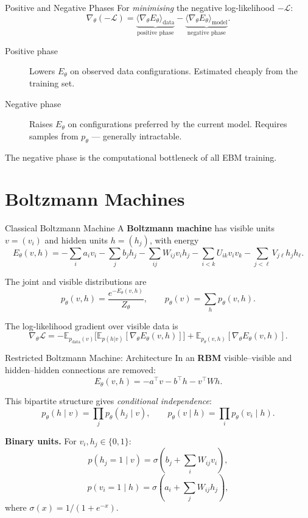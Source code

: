 \documentclass[aspectratio=169]{beamer}
\newcommand{\E}{\mathbb{E}}
\newcommand{\sigmoid}{\sigma}
\newcommand{\pdata}{p_{\mathrm{data}}}
\newcommand{\pmodel}{p_{\theta}}
\newcommand{\Zth}{Z_\theta}
\begin{document}
\begin{frame}{Positive and Negative Phases}
For \emph{minimising} the negative log-likelihood $-\mathcal{L}$:
\[
  \nabla_\theta(-\mathcal{L})
  = \underbrace{\langle\nabla_\theta E_\theta\rangle_{\mathrm{data}}}_{\text{positive phase}}
    -
    \underbrace{\langle\nabla_\theta E_\theta\rangle_{\mathrm{model}}}_{\text{negative phase}}.
\]

\begin{description}
  \item[Positive phase] Lowers $E_\theta$ on observed data configurations.
        Estimated cheaply from the training set.
  \item[Negative phase] Raises $E_\theta$ on configurations preferred by the
        current model. Requires samples from $\pmodel$ — generally intractable.
\end{description}

The negative phase is the computational bottleneck of all EBM training.
\end{frame}

\section{Boltzmann Machines}

\begin{frame}{Classical Boltzmann Machine}
A \textbf{Boltzmann machine} has visible units $v=(v_i)$ and hidden units
$h=(h_j)$, with energy
\[
  E_\theta(v,h)
  = -\sum_i a_i v_i
    - \sum_j b_j h_j
    - \sum_{ij} W_{ij}v_i h_j
    - \sum_{i<k} U_{ik}v_i v_k
    - \sum_{j<\ell} V_{j\ell}h_j h_\ell.
\]

The joint and visible distributions are
\[
  p_\theta(v,h)=\frac{e^{-E_\theta(v,h)}}{\Zth},
  \qquad
  p_\theta(v)=\sum_h p_\theta(v,h).
\]

The log-likelihood gradient over visible data is
\[
  \nabla_\theta\mathcal{L}
  = -\E_{\pdata(v)}\bigl[\E_{p(h|v)}[\nabla_\theta E_\theta(v,h)]\bigr]
    + \E_{p_\theta(v,h)}[\nabla_\theta E_\theta(v,h)].
\]
\end{frame}

\begin{frame}{Restricted Boltzmann Machine: Architecture}
In an \textbf{RBM} visible–visible and hidden–hidden connections are removed:
\[
  E_\theta(v,h)
  = -a^\top v - b^\top h - v^\top W h.
\]

This bipartite structure gives \emph{conditional independence}:
\[
  p_\theta(h\mid v) = \prod_j p_\theta(h_j\mid v),
  \qquad
  p_\theta(v\mid h) = \prod_i p_\theta(v_i\mid h).
\]

\textbf{Binary units.} For $v_i,h_j\in\{0,1\}$:
\[
  p(h_j=1\mid v)
  = \sigmoid\!\left(b_j + \textstyle\sum_i W_{ij}v_i\right),
\]
\[
  p(v_i=1\mid h)
  = \sigmoid\!\left(a_i + \textstyle\sum_j W_{ij}h_j\right),
\]
where $\sigmoid(x) = 1/(1+e^{-x})$.
\end{frame}
\end{document}
